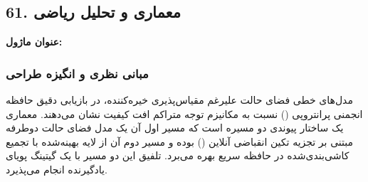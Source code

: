 \subsection*{61. معماری و تحلیل ریاضی }
\textbf{عنوان ماژول:} 

\subsubsection*{مبانی نظری و انگیزه طراحی}
مدل‌های خطی فضای حالت علیرغم مقیاس‌پذیری خیره‌کننده، در بازیابی دقیق حافظه انجمنی پرانتروپی () نسبت به مکانیزم توجه متراکم افت کیفیت نشان می‌دهند. معماری  یک ساختار پیوندی دو مسیره است که مسیر اول آن یک مدل فضای حالت دوطرفه مبتنی بر تجزیه تکین انقباضی آنلاین () بوده و مسیر دوم آن از لایه بهینه‌شده  با تجمیع کاشی‌بندی‌شده در حافظه سریع  بهره می‌برد. تلفیق این دو مسیر با یک گیتینگ پویای یادگیرنده انجام می‌پذیرد.

